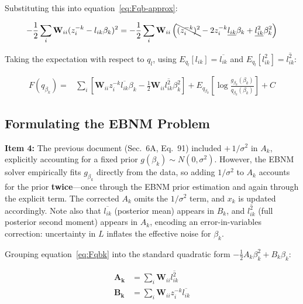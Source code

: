 \documentclass{article}[12pt]
\begin{document}
Substituting this into equation~\ref{eq:Fqb-approx}:

\begin{equation}
    -\frac{1}{2}\sum_i \mathbf{W}_{ii}(z_i^{-k} - l_{ik}\beta_k)^2 = -\frac{1}{2}\sum_i \mathbf{W}_{ii} \left( \bcancel{(z_i^{-k})^2} - 2z_i^{-k}\underline{l_{ik}}\beta_k + \underline{l_{ik}^2}\beta_k^2 \right)
\end{equation}

Taking the expectation with respect to $q_l$, using $E_{q_l}[l_{ik}] = \overline{l_{ik}}$ and $E_{q_l}[l_{ik}^2] = \overline{l_{ik}^2}$:

\begin{equation}
\begin{aligned}
    F(q_{\beta_k}) = {} & \sum_i \left[ \mathbf{W}_{ii} z_i^{-k} \overline{l_{ik}} \beta_k - \frac{1}{2} \mathbf{W}_{ii} \overline{l_{ik}^2} \beta_k^2 \right]
    + E_{q_{\beta_k}} \left[ \log \frac{g_{\beta_k}(\beta_k)}{q_{\beta_k}(\beta_k)} \right] + C
\end{aligned}\label{eq:Fqbk}
\end{equation}

\subsection{Formulating the EBNM Problem}

\begin{corrbox}
\textbf{Item 4:} The previous document (Sec.~6A, Eq.~91) included $+\,1/\sigma^2$
in $A_k$, explicitly accounting for a fixed prior $g(\beta_k)\sim N(0,\sigma^2)$.
However, the EBNM solver empirically fits $g_{\beta_k}$ directly from the data,
so adding $1/\sigma^2$ to $A_k$ accounts for the prior \textbf{twice}---once
through the EBNM prior estimation and again through the explicit term. The
corrected $A_k$ omits the $1/\sigma^2$ term, and $x_k$ is updated accordingly.
Note also that $\overline{l_{ik}}$ (posterior mean) appears in $B_k$, and
$\overline{l_{ik}^2}$ (full posterior second moment) appears in $A_k$, encoding
an error-in-variables correction: uncertainty in $L$ inflates the effective
noise for $\beta_k$.
\end{corrbox}

\medskip
Grouping equation~\ref{eq:Fqbk} into the standard quadratic form $-\frac{1}{2}A_k\beta_k^2 + B_k\beta_k$:

\begin{align}
    \mathbf{A_k} &= \sum_i \mathbf{W}_{ii} \overline{l_{ik}^2}\label{eq:A-beta}\\
    \mathbf{B_k} &= \sum_i \mathbf{W}_{ii} z_i^{-k} \overline{l_{ik}}\label{eq:B-beta}
\end{align}
\end{document}
